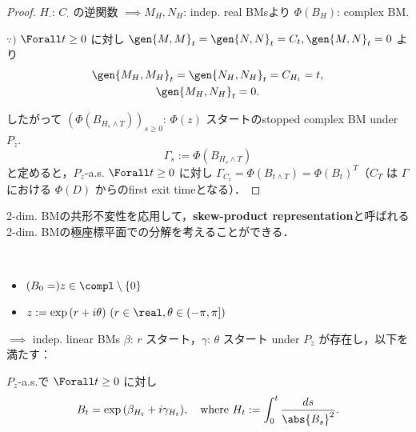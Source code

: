 \documentclass{jsarticle}
\begin{document}
\begin{proof}
    $H_{\cdot}$: $C_{\cdot}$ の逆関数
    $\implies M_H, N_H$: indep. real BMsより $\Phi(B_H)$: complex BM.

    \begin{screen}
        $\because)$
        $\Forall t\ge0$ に対し $\gen{M, M}_t=\gen{N, N}_t=C_t, \gen{M, N}_t=0$ より
        \begin{gather}
            \gen{M_{H}, M_{H}}_t
            = \gen{N_{H}, N_{H}}_t
            = C_{H_t}
            = t, \\
            \gen{M_{H}, N_{H}}_t = 0.
        \end{gather}
    \end{screen}

    したがって $(\Phi(B_{H_s\wedge T}))_{s\ge0}$: $\Phi(z)$ スタートのstopped complex BM under $P_z$.
    $$
    \Gamma_s
    := \Phi(B_{H_s\wedge T})
    $$
    と定めると，$P_z$-a.s. $\Forall t\ge0$ に対し $\Gamma_{C_t}=\Phi(B_{t\wedge T})=\Phi(B_t)^T$（$C_T$ は $\Gamma$ における $\Phi(D)$ からのfirst exit timeとなる）．
\end{proof}

2-dim. BMの共形不変性を応用して，\textbf{skew-product representation}と呼ばれる2-dim. BMの極座標平面での分解を考えることができる．

\begin{screen}
    \begin{thm}\label{thm:719}~
        \begin{itemize}
            \item 
            $(B_0=)z\in\compl\setminus\{0\}$
            \item 
            $z:=\exp{(r+i\theta)}\ (r\in\real, \theta\in(-\pi, \pi])$
        \end{itemize}
        $\implies $ indep. linear BMs $\beta$: $r$ スタート，$\gamma$: $\theta$ スタート under $P_z$ が存在し，以下を満たす：
        
        $P_z$-a.s.で $\Forall t\ge0$ に対し
        $$
        B_t=\exp{(\beta_{H_t}+i\gamma_{H_t})},\quad
        \text{where }H_t:=\int_0^t\frac{ds}{\abs{B_s}^2}.
        $$
    \end{thm}
\end{screen}
\end{document}
